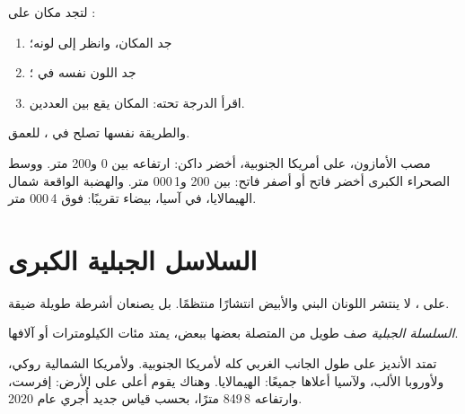 \begin{method}\label{met:g4:world-physical-map:reading}
لتجد  مكان على :
\begin{enumerate}
  \item جد المكان، وانظر إلى لونه؛
  \item جد اللون نفسه في ؛
  \item اقرأ الدرجة تحته:  المكان يقع بين
        العددين.
\end{enumerate}
والطريقة نفسها تصلح في ، للعمق.
\end{method}

\begin{example}\label{ex:g4:world-physical-map:three}
مصب الأمازون، على  أمريكا الجنوبية، أخضر داكن: ارتفاعه بين 0 و200
متر. ووسط الصحراء الكبرى أخضر فاتح أو أصفر فاتح: بين 200 و1\,000 متر.
والهضبة الواقعة شمال الهيمالايا، في آسيا، بيضاء تقريبًا: فوق 4\,000
متر.
\end{example}

\section{السلاسل الجبلية الكبرى}

على ، لا ينتشر اللونان البني والأبيض انتشارًا منتظمًا. بل يصنعان
أشرطة طويلة ضيقة.

\begin{definition}\label{def:g4:world-physical-map:range}
\emph{السلسلة الجبلية} صف طويل من  المتصلة بعضها
ببعض، يمتد مئات الكيلومترات أو آلافها.
\end{definition}

تمتد  الأنديز على طول الجانب الغربي كله لأمريكا الجنوبية. ولأمريكا
الشمالية  روكي، ولأوروبا  الألب، ولآسيا أعلاها جميعًا: 
الهيمالايا. وهناك يقوم أعلى  على الأرض:  إفرست، وارتفاعه
8\,849 مترًا، بحسب قياس جديد أُجري عام 2020.

